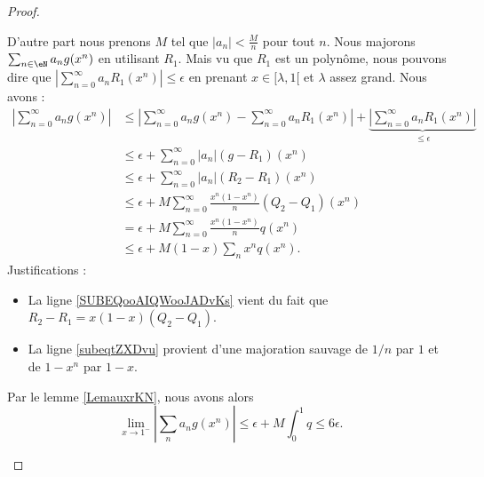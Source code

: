 \begin{proof}
\begin{subproof}
		D'autre part nous prenons \( M\) tel que \( | a_n |<\frac{ M }{ n }\) pour tout \( n\). Nous majorons \( \sum_{n \in \eN}a_ng(x^n)\) en utilisant \( R_1\). Mais vu que \( R_1\) est un polynôme, nous pouvons dire que \( | \sum_{n=0}^{\infty}a_nR_1(x^n) |\leq \epsilon\) en prenant \( x\in\mathopen[ \lambda , 1 [\) et \( \lambda\) assez grand. Nous avons :
		\begin{subequations}
			\begin{align}
				\left| \sum_{n=0}^{\infty}a_ng(x^n) \right| & \leq\left| \sum_{n=0}^{\infty}a_ng(x^n)-\sum_{n=0}^{\infty}a_nR_1(x^n) \right| +\underbrace{\left| \sum_{n=0}^{\infty}a_nR_1(x^n) \right|}_{\leq \epsilon} \\
				                                            & \leq \epsilon+\sum_{n=0}^{\infty}| a_n |(g-R_1)(x^n)                                                                                                       \\
				                                            & \leq \epsilon+\sum_{n=0}^{\infty}| a_n |(R_2-R_1)(x^n)                                                                                                     \\
				                                            & \leq \epsilon+M\sum_{n=0}^{\infty}\frac{ x^n(1-x^n) }{ n }(Q_2-Q_1)(x^n) \label{SUBEQooAIQWooJADvKs}                                                       \\
				                                            & =    \epsilon+M\sum_{n=0}^{\infty}\frac{ x^n(1-x^n) }{ n }q(x^n)                                                                                           \\
				                                            & \leq \epsilon+M(1-x)\sum_nx^nq(x^n).   \label{subeqtZXDvu}
			\end{align}
		\end{subequations}
		Justifications :
		\begin{itemize}
			\item La ligne \eqref{SUBEQooAIQWooJADvKs} vient du fait que \( R_2-R_1=x(1-x)(Q_2-Q_1)\).
			\item La ligne \eqref{subeqtZXDvu} provient d'une majoration sauvage de \( 1/n\) par \( 1\) et de \( 1-x^n\) par \( 1-x\).
		\end{itemize}
		Par le lemme \ref{LemauxrKN}, nous avons alors
		\begin{equation}
			\lim_{x\to 1^-} | \sum_na_ng(x^n) |\leq \epsilon+M\int_0^1q\leq 6\epsilon.
		\end{equation}
	\end{subproof}
\end{proof}

